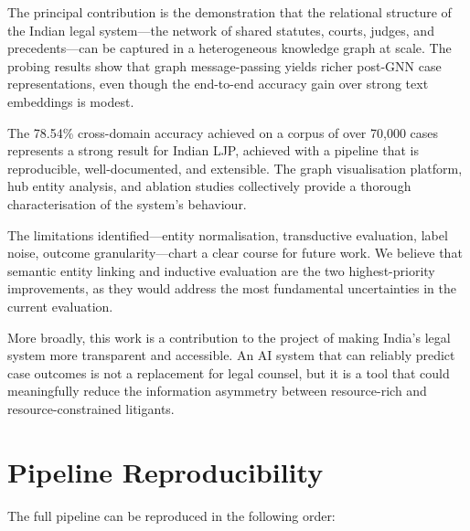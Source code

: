 \documentclass[12pt,a4paper]{report}
\begin{document}
The principal contribution is the demonstration that the relational structure of the Indian legal system---the network of shared statutes, courts, judges, and precedents---can be captured in a heterogeneous knowledge graph at scale. The probing results show that graph message-passing yields richer post-GNN case representations, even though the end-to-end accuracy gain over strong text embeddings is modest.

The 78.54\% cross-domain accuracy achieved on a corpus of over 70,000 cases represents a strong result for Indian LJP, achieved with a pipeline that is reproducible, well-documented, and extensible. The graph visualisation platform, hub entity analysis, and ablation studies collectively provide a thorough characterisation of the system's behaviour.

The limitations identified---entity normalisation, transductive evaluation, label noise, outcome granularity---chart a clear course for future work. We believe that semantic entity linking and inductive evaluation are the two highest-priority improvements, as they would address the most fundamental uncertainties in the current evaluation.

More broadly, this work is a contribution to the project of making India's legal system more transparent and accessible. An AI system that can reliably predict case outcomes is not a replacement for legal counsel, but it is a tool that could meaningfully reduce the information asymmetry between resource-rich and resource-constrained litigants.

\appendix

\chapter{Pipeline Reproducibility}
\label{app:reproducibility}

The full pipeline can be reproduced in the following order:
\end{document}
